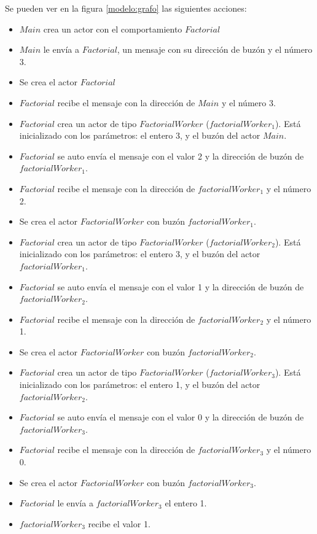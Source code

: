 Se pueden ver en la figura \ref{modelo:grafo} las siguientes acciones:

\begin{itemize}
\item $Main$ crea un actor con el comportamiento $Factorial$
\item $Main$ le envía a $Factorial$, un mensaje con su dirección de buzón y el número 3.
\item Se crea el actor $Factorial$
\item $Factorial$ recibe el mensaje con la dirección de $Main$ y el número 3.

\item $Factorial$ crea un actor de tipo $FactorialWorker$ ($factorialWorker_1$). Está inicializado con los parámetros: el entero 3, y el buzón del actor $Main$.
\item $Factorial$ se auto envía el mensaje con el valor 2 y la dirección de buzón de $factorialWorker_1$.
\item $Factorial$ recibe el mensaje con la dirección de $factorialWorker_1$ y el número 2.
\item Se crea el actor $FactorialWorker$ con buzón $factorialWorker_1$.

\item $Factorial$ crea un actor de tipo $FactorialWorker$ ($factorialWorker_2$). Está inicializado con los parámetros: el entero 3, y el buzón del actor $factorialWorker_1$.
\item $Factorial$ se auto envía el mensaje con el valor 1 y la dirección de buzón de $factorialWorker_2$.
\item $Factorial$ recibe el mensaje con la dirección de $factorialWorker_2$ y el número 1.
\item Se crea el actor $FactorialWorker$ con buzón $factorialWorker_2$.

\item $Factorial$ crea un actor de tipo $FactorialWorker$ ($factorialWorker_3$). Está inicializado con los parámetros: el entero 1, y el buzón del actor $factorialWorker_2$.
\item $Factorial$ se auto envía el mensaje con el valor 0 y la dirección de buzón de $factorialWorker_3$.
\item $Factorial$ recibe el mensaje con la dirección de $factorialWorker_3$ y el número 0.
\item Se crea el actor $FactorialWorker$ con buzón $factorialWorker_3$.

\item $Factorial$ le envía a $factorialWorker_3$ el entero 1.
\item $factorialWorker_3$ recibe el valor 1.


\end{itemize}
